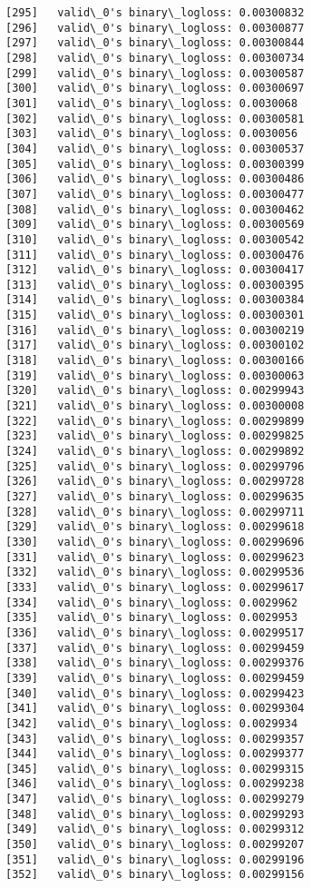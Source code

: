 \documentclass[11pt]{article}
\begin{document}
\begin{Verbatim}[commandchars=\\\{\}]
[295]	valid\_0's binary\_logloss: 0.00300832
[296]	valid\_0's binary\_logloss: 0.00300877
[297]	valid\_0's binary\_logloss: 0.00300844
[298]	valid\_0's binary\_logloss: 0.00300734
[299]	valid\_0's binary\_logloss: 0.00300587
[300]	valid\_0's binary\_logloss: 0.00300697
[301]	valid\_0's binary\_logloss: 0.0030068
[302]	valid\_0's binary\_logloss: 0.00300581
[303]	valid\_0's binary\_logloss: 0.0030056
[304]	valid\_0's binary\_logloss: 0.00300537
[305]	valid\_0's binary\_logloss: 0.00300399
[306]	valid\_0's binary\_logloss: 0.00300486
[307]	valid\_0's binary\_logloss: 0.00300477
[308]	valid\_0's binary\_logloss: 0.00300462
[309]	valid\_0's binary\_logloss: 0.00300569
[310]	valid\_0's binary\_logloss: 0.00300542
[311]	valid\_0's binary\_logloss: 0.00300476
[312]	valid\_0's binary\_logloss: 0.00300417
[313]	valid\_0's binary\_logloss: 0.00300395
[314]	valid\_0's binary\_logloss: 0.00300384
[315]	valid\_0's binary\_logloss: 0.00300301
[316]	valid\_0's binary\_logloss: 0.00300219
[317]	valid\_0's binary\_logloss: 0.00300102
[318]	valid\_0's binary\_logloss: 0.00300166
[319]	valid\_0's binary\_logloss: 0.00300063
[320]	valid\_0's binary\_logloss: 0.00299943
[321]	valid\_0's binary\_logloss: 0.00300008
[322]	valid\_0's binary\_logloss: 0.00299899
[323]	valid\_0's binary\_logloss: 0.00299825
[324]	valid\_0's binary\_logloss: 0.00299892
[325]	valid\_0's binary\_logloss: 0.00299796
[326]	valid\_0's binary\_logloss: 0.00299728
[327]	valid\_0's binary\_logloss: 0.00299635
[328]	valid\_0's binary\_logloss: 0.00299711
[329]	valid\_0's binary\_logloss: 0.00299618
[330]	valid\_0's binary\_logloss: 0.00299696
[331]	valid\_0's binary\_logloss: 0.00299623
[332]	valid\_0's binary\_logloss: 0.00299536
[333]	valid\_0's binary\_logloss: 0.00299617
[334]	valid\_0's binary\_logloss: 0.0029962
[335]	valid\_0's binary\_logloss: 0.0029953
[336]	valid\_0's binary\_logloss: 0.00299517
[337]	valid\_0's binary\_logloss: 0.00299459
[338]	valid\_0's binary\_logloss: 0.00299376
[339]	valid\_0's binary\_logloss: 0.00299459
[340]	valid\_0's binary\_logloss: 0.00299423
[341]	valid\_0's binary\_logloss: 0.00299304
[342]	valid\_0's binary\_logloss: 0.0029934
[343]	valid\_0's binary\_logloss: 0.00299357
[344]	valid\_0's binary\_logloss: 0.00299377
[345]	valid\_0's binary\_logloss: 0.00299315
[346]	valid\_0's binary\_logloss: 0.00299238
[347]	valid\_0's binary\_logloss: 0.00299279
[348]	valid\_0's binary\_logloss: 0.00299293
[349]	valid\_0's binary\_logloss: 0.00299312
[350]	valid\_0's binary\_logloss: 0.00299207
[351]	valid\_0's binary\_logloss: 0.00299196
[352]	valid\_0's binary\_logloss: 0.00299156

\end{Verbatim}
\end{document}
